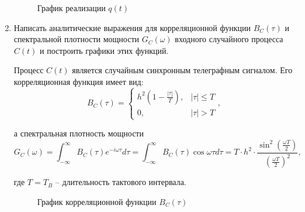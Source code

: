 \documentclass[a4paper, 12pt]{article}
\begin{document}
\begin{enumerate}
  \begin{figure}[H]
    \centering
    \caption{График реализации $q(t)$}
  \end{figure}

  \item Написать аналитические выражения для корреляционной 
  функции $B_C(\tau)$ и спектральной плотности мощности 
  $G_C(\omega)$ входного случайного процесса $C(t)$ 
  и построить графики этих функций.

  Процесс $C(t)$ является случайным синхронным телеграфным сигналом. Его корреляционная функция имеет вид:
  \begin{equation}
    B_C(\tau)=\begin{cases}
      h^2(1-\frac{|\tau|}{T}),&|\tau|\leq T\\
      0, & |\tau| > T
    \end{cases}, 
  \end{equation}

  а спектральная плотность мощности
  \begin{equation}
    G_C(\omega)
      =\int^\infty_{-\infty}B_C(\tau)e^{-i\omega\tau}d\tau
      =\int^\infty_{-\infty}B_C(\tau)\cos{\omega\tau}d\tau
      =T\cdot h^2\cdot\frac{\sin^2(\frac{\omega T}{2})}{(\frac{\omega T}{2})^2}, 
  \end{equation}

  где $T=T_B$ -- длительность тактового интервала.
  \begin{figure}[H]
    \centering
    \caption{График корреляционной функции $B_C(\tau)$}
  \end{figure}


\end{enumerate}
\end{document}
